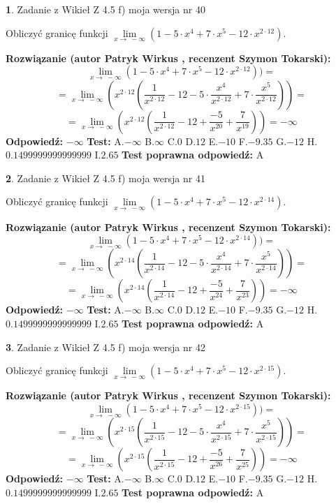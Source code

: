 \documentclass[12pt, a4paper]{article}
\theoremstyle{definition} %
\newtheorem{zad}{}
\newcommand{\zadStart}[1]{\begin{zad}#1\newline}
\newcommand{\zadStop}{\end{zad}}
\newcommand{\rozwStart}[2]{\noindent \textbf{Rozwiązanie (autor #1 , recenzent #2): }\newline}
\newcommand{\rozwStop}{\newline}
\newcommand{\odpStart}{\noindent \textbf{Odpowiedź:}\newline}
\newcommand{\odpStop}{\newline}
\newcommand{\testStart}{\noindent \textbf{Test:}\newline}
\newcommand{\testStop}{\newline}
\newcommand{\kluczStart}{\noindent \textbf{Test poprawna odpowiedź:}\newline}
\newcommand{\kluczStop}{\newline}
\begin{document}
\zadStart{Zadanie z Wikieł Z 4.5 f) moja wersja nr 40}


Obliczyć granicę funkcji  $\lim\limits_{x\to\ -\infty}(1 - 5 \cdot x^{4}+7 \cdot x^{5}- 12 \cdot x^{2\cdot12})$.
\zadStop
\rozwStart{Patryk Wirkus}{Szymon Tokarski}
$$\lim\limits_{x\to\ -\infty}(1 - 5 \cdot x^{4}+7 \cdot x^{5}- 12 \cdot x^{2\cdot12}))=$$
$$=\lim\limits_{x\to\ -\infty}(x^{2\cdot12}(\frac{1}{x^{2\cdot12}}-12 -5 \cdot \frac{x^{4}}{x^{2\cdot12}}+7 \cdot \frac{x^{5}}{x^{2\cdot12}}))=$$
$$=\lim\limits_{x\to\ -\infty}(x^{2\cdot12}(\frac{1}{x^{2\cdot12}}-12 + \frac{-5}{x^{20}}+ \frac{7}{x^{19}}))=-\infty$$
\rozwStop
\odpStart
$-\infty$
\odpStop
\testStart
A.$-\infty$ B.$\infty$ C.$0$ D.$12$ E.$-10$
F.$-9.35$ G.$-12$
H.$0.1499999999999999$
I.$2.65$
\testStop
\kluczStart
A
\kluczStop



\zadStart{Zadanie z Wikieł Z 4.5 f) moja wersja nr 41}


Obliczyć granicę funkcji  $\lim\limits_{x\to\ -\infty}(1 - 5 \cdot x^{4}+7 \cdot x^{5}- 12 \cdot x^{2\cdot14})$.
\zadStop
\rozwStart{Patryk Wirkus}{Szymon Tokarski}
$$\lim\limits_{x\to\ -\infty}(1 - 5 \cdot x^{4}+7 \cdot x^{5}- 12 \cdot x^{2\cdot14}))=$$
$$=\lim\limits_{x\to\ -\infty}(x^{2\cdot14}(\frac{1}{x^{2\cdot14}}-12 -5 \cdot \frac{x^{4}}{x^{2\cdot14}}+7 \cdot \frac{x^{5}}{x^{2\cdot14}}))=$$
$$=\lim\limits_{x\to\ -\infty}(x^{2\cdot14}(\frac{1}{x^{2\cdot14}}-12 + \frac{-5}{x^{24}}+ \frac{7}{x^{23}}))=-\infty$$
\rozwStop
\odpStart
$-\infty$
\odpStop
\testStart
A.$-\infty$ B.$\infty$ C.$0$ D.$12$ E.$-10$
F.$-9.35$ G.$-12$
H.$0.1499999999999999$
I.$2.65$
\testStop
\kluczStart
A
\kluczStop



\zadStart{Zadanie z Wikieł Z 4.5 f) moja wersja nr 42}


Obliczyć granicę funkcji  $\lim\limits_{x\to\ -\infty}(1 - 5 \cdot x^{4}+7 \cdot x^{5}- 12 \cdot x^{2\cdot15})$.
\zadStop
\rozwStart{Patryk Wirkus}{Szymon Tokarski}
$$\lim\limits_{x\to\ -\infty}(1 - 5 \cdot x^{4}+7 \cdot x^{5}- 12 \cdot x^{2\cdot15}))=$$
$$=\lim\limits_{x\to\ -\infty}(x^{2\cdot15}(\frac{1}{x^{2\cdot15}}-12 -5 \cdot \frac{x^{4}}{x^{2\cdot15}}+7 \cdot \frac{x^{5}}{x^{2\cdot15}}))=$$
$$=\lim\limits_{x\to\ -\infty}(x^{2\cdot15}(\frac{1}{x^{2\cdot15}}-12 + \frac{-5}{x^{26}}+ \frac{7}{x^{25}}))=-\infty$$
\rozwStop
\odpStart
$-\infty$
\odpStop
\testStart
A.$-\infty$ B.$\infty$ C.$0$ D.$12$ E.$-10$
F.$-9.35$ G.$-12$
H.$0.1499999999999999$
I.$2.65$
\testStop
\kluczStart
A
\kluczStop
\end{document}
